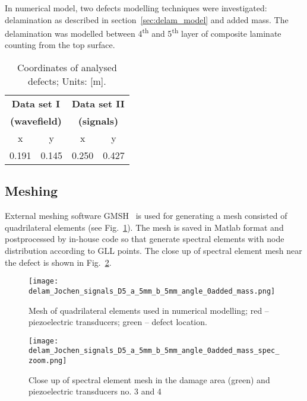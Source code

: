 \documentclass[preprint,12pt]{elsarticle}
\begin{document}
	In numerical model, two defects modelling techniques were investigated: delamination as described in section~\ref{sec:delam_model} and added mass. The delamination was modelled between 4\textsuperscript{th} and 5\textsuperscript{th} layer of composite laminate counting from the top surface.
	\begin{table}
		\renewcommand{\arraystretch}{1.3}
		\centering \footnotesize
		\caption{Coordinates of analysed defects; Units: [m].}
		\begin{tabular}{cccc} 
			\toprule
			\multicolumn{2}{c}{\textbf{Data set I} }	& \multicolumn{2}{c}{\textbf{Data set II} } \\
			\multicolumn{2}{c}{\textbf{(wavefield)} }	& \multicolumn{2}{c}{\textbf{(signals)} } \\
			\cmidrule(lr){1-2} \cmidrule(lr){3-4}
			x & y &  x &  y  \\
			0.191 & 0.145 & 0.250  & 0.427 \\ 
			\bottomrule 
		\end{tabular} 
		\label{tab:defect_coordinates}
	\end{table}		
	\subsection{Meshing}
	External meshing software GMSH~\cite{Geuzaine2009} is used for generating a mesh consisted of quadrilateral elements (see Fig.~\ref{fig:quad_mesh}). The mesh is saved in Matlab format and postprocessed by in-house code so that generate spectral elements with node distribution according to GLL points. The close up of spectral element mesh near the defect is shown in Fig.~\ref{fig:spec_mesh_zoom}. 
	\begin{figure} [h!]
		\centering
		\texttt{[image: delam\_Jochen\_signals\_D5\_a\_5mm\_b\_5mm\_angle\_0added\_mass.png]}	
		\caption{Mesh of quadrilateral elements used in numerical modelling; red -- piezoelectric transducers; green -- defect location.}
		\label{fig:quad_mesh}
	\end{figure}
   \begin{figure} [h!]
   	\centering
   	\texttt{[image: delam\_Jochen\_signals\_D5\_a\_5mm\_b\_5mm\_angle\_0added\_mass\_spec\_zoom.png]}	
   	\caption{Close up of spectral element mesh in the damage area (green) and piezoelectric transducers no. 3 and 4}
   	\label{fig:spec_mesh_zoom}
   \end{figure}
   \clearpage
	
\end{document}

